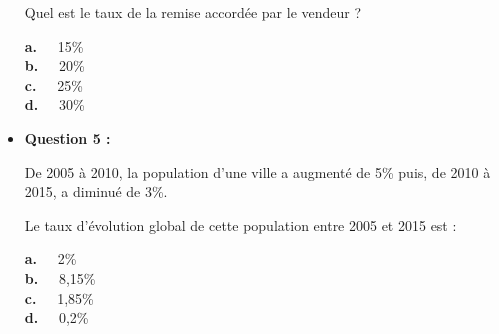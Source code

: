 \begin{itemize}
     Quel est le taux de la remise accordée par le vendeur ?
     \par
     \textbf{a.~~} 15\% \\
     \textbf{b.~~} 20\%  \\
     \textbf{c.~~} 25\% \\
     \textbf{d.~~} 30\% \\
     \par
     \item \textbf{Question 5 :}
     \par
     De 2005 à 2010, la population d'une ville a augmenté de 5\% puis, de 2010 à 2015, a diminué de 3\%.
     \par
     Le taux d'évolution global de cette population entre 2005 et 2015 est :
     \par
     \textbf{a.~~} 2\% \\
     \textbf{b.~~} 8,15\%  \\
     \textbf{c.~~} 1,85\% \\
     \textbf{d.~~} 0,2\% \\
     \par
\end{itemize}
